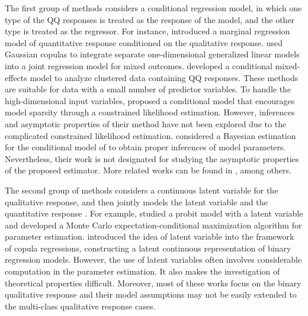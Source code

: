 \documentclass[12pt]{article}
\begin{document}
The first group of methods considers a conditional regression model, in which one type of the QQ responses is treated as the response of the model, and the other type is treated as the regressor.
For instance, \cite{fitzmaurice1997regression} introduced a marginal regression model of quantitative response conditioned on the qualitative response.
\cite{song2009joint} used Gaussian copulas to integrate separate one-dimensional generalized linear models into a joint regression model for mixed outcomes.
\cite{lin2010association} developed a conditional mixed-effects model to analyze clustered data containing QQ responses.
These methods are suitable for data with a small number of predictor variables.
To handle the high-dimensional input variables, \cite{deng2015qq} proposed a conditional model that encourages model sparsity through a constrained likelihood estimation.
However, inferences and asymptotic properties of their method have not been explored due to the complicated constrained likelihood estimation.
\cite{kang2018bayesian} considered a Bayesian estimation for the conditional model of \cite{deng2015qq} to obtain proper inferences of model parameters.
Nevertheless, their work is not designated for studying the asymptotic properties of the proposed estimator.
More related works can be found in \cite{chen2014selection, yang2014mixed, guglielmi2018a}, among others.

The second group of methods considers a continuous latent variable for the qualitative response, and then jointly models the latent variable and the quantitative response \citep{sammel1997latent, dunson2005bayesian, bello2012hierarchical}.
For example, \cite{gueorguieva2001correlated} studied a probit model with a latent variable and developed a Monte Carlo expectation-conditional maximization algorithm for parameter estimation.
\cite{klein2019mixed} introduced the idea of latent variable into the framework of copula regressions, constructing a latent continuous representation of binary regression models.
However, the use of latent variables often involves considerable computation in the parameter estimation.
It also makes the investigation of theoretical properties difficult.
Moreover, most of these works focus on the binary qualitative response and their model assumptions may not be easily extended to the multi-class qualitative response cases.
\end{document}

